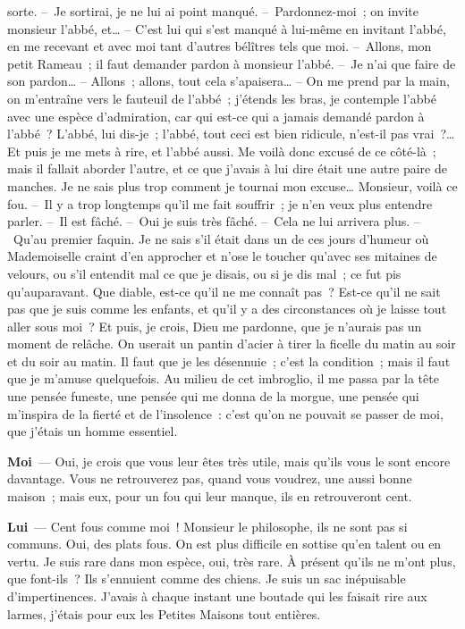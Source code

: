\documentclass[french,twoside]{book} %
\newcommand{\labelchar}[1]{\textbf{\color{rubric} #1}}
\begin{document}
sorte. – Je sortirai, je ne lui ai point manqué. – Pardonnez-moi ; on invite monsieur l’abbé, et… – C’est lui qui s’est manqué à lui-même en invitant l’abbé, en me recevant et avec moi tant d’autres bélîtres tels que moi. – Allons, mon petit Rameau ; il faut demander pardon à monsieur l’abbé. – Je n’ai que faire de son pardon… – Allons ; allons, tout cela s’apaisera… – On me prend par la main, on m’entraîne vers le fauteuil de l’abbé ; j’étends les bras, je contemple l’abbé avec une espèce d’admiration, car qui est-ce qui a jamais demandé pardon à l’abbé ? L’abbé, lui dis-je ; l’abbé, tout ceci est bien ridicule, n’est-il pas vrai ?… Et puis je me mets à rire, et l’abbé aussi. Me voilà donc excusé de ce côté-là ; mais il fallait aborder l’autre, et ce que j’avais à lui dire était une autre paire de manches. Je ne sais plus trop comment je tournai mon excuse… Monsieur, voilà ce fou. – Il y a trop longtemps qu’il me fait souffrir ; je n’en veux plus entendre parler. – Il est fâché. – Oui je suis très fâché. – Cela ne lui arrivera plus. – Qu’au premier faquin. Je ne sais s’il était dans un de ces jours d’humeur où Mademoiselle craint d’en approcher et n’ose le toucher qu’avec ses mitaines de velours, ou s’il entendit mal ce que je disais, ou si je dis mal ; ce fut pis qu’auparavant. Que diable, est-ce qu’il ne me connaît pas ? Est-ce qu’il ne sait pas que je suis comme les enfants, et qu’il y a des circonstances où je laisse tout aller sous moi ? Et puis, je crois, Dieu me pardonne, que je n’aurais pas un moment de relâche. On userait un pantin d’acier à tirer la ficelle du matin au soir et du soir au matin. Il faut que je les désennuie ; c’est la condition ; mais il faut que je m’amuse quelquefois. Au milieu de cet imbroglio, il me passa par la tête une pensée funeste, une pensée qui me donna de la morgue, une pensée qui m’inspira de la fierté et de l’insolence : c’est qu’on ne pouvait se passer de moi, que j’étais un homme essentiel.\par
\labelchar{Moi} — Oui, je crois que vous leur êtes très utile, mais qu’ils vous le sont encore davantage. Vous ne retrouverez pas, quand vous voudrez, une aussi bonne maison ; mais eux, pour un fou qui leur manque, ils en retrouveront cent.\par
\labelchar{Lui} — Cent fous comme moi ! Monsieur le philosophe, ils ne sont pas si communs. Oui, des plats fous. On est plus difficile en sottise qu’en talent ou en vertu. Je suis rare dans mon espèce, oui, très rare. À présent qu’ils ne m’ont plus, que font-ils ? Ils s’ennuient comme des chiens. Je suis un sac inépuisable d’impertinences. J’avais à chaque instant une boutade qui les faisait rire aux larmes, j’étais pour eux les Petites Maisons tout entières.\par
\end{document}
